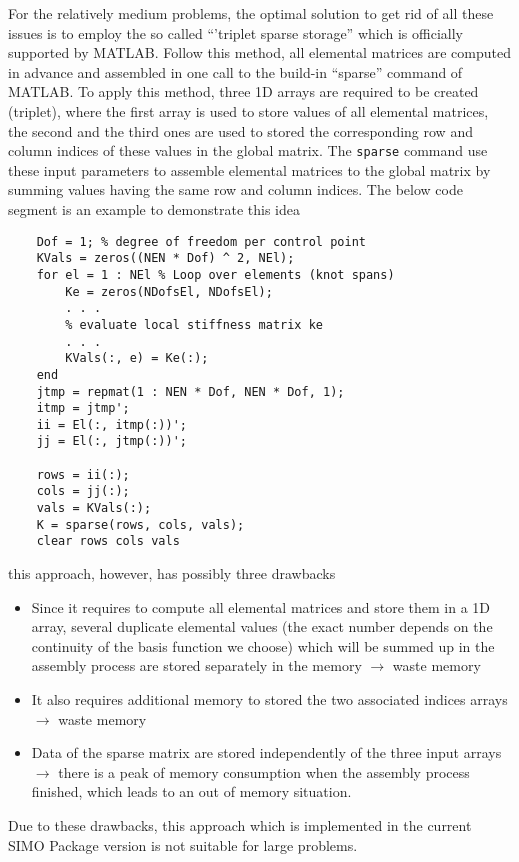 For the relatively medium problems, the optimal solution to get rid of all these issues is to employ the so called ``'triplet sparse storage'' which is officially supported by MATLAB. Follow this method, all elemental matrices are computed in advance and assembled in one call to the build-in ``sparse'' command of MATLAB. To apply this method, three 1D arrays are required to be created (triplet), where the first array is used to store values of all elemental matrices, the second and the third ones are used to stored the corresponding row and column indices of these values in the global matrix. The \lstinline{sparse} command use these input parameters to assemble elemental matrices to the global matrix by summing values having the same row and column indices. The below code segment is an example to demonstrate this idea
\begin{lstlisting}
    Dof = 1; % degree of freedom per control point
    KVals = zeros((NEN * Dof) ^ 2, NEl);
    for el = 1 : NEl % Loop over elements (knot spans)
        Ke = zeros(NDofsEl, NDofsEl);
        . . .
        % evaluate local stiffness matrix ke
        . . .
        KVals(:, e) = Ke(:);
    end
    jtmp = repmat(1 : NEN * Dof, NEN * Dof, 1);
    itmp = jtmp';
    ii = El(:, itmp(:))';
    jj = El(:, jtmp(:))';

    rows = ii(:);
    cols = jj(:);
    vals = KVals(:);
    K = sparse(rows, cols, vals);
    clear rows cols vals
\end{lstlisting}
this approach, however, has possibly three drawbacks
\begin{itemize}
    \item Since it requires to compute all elemental matrices and store them in a 1D array, several duplicate elemental values (the exact number depends on the continuity of the basis function we choose) which will be summed up in the assembly process are stored separately in the memory $\rightarrow$ waste memory
    \item It also requires additional memory to stored the two associated indices arrays $\rightarrow$ waste memory
    \item Data of the sparse matrix are stored independently of the three input arrays $\rightarrow$ there is a peak of memory consumption when the assembly process finished, which leads to an out of memory situation.
\end{itemize}
Due to these drawbacks, this approach which is implemented in the current SIMO Package version is not suitable for large problems.

